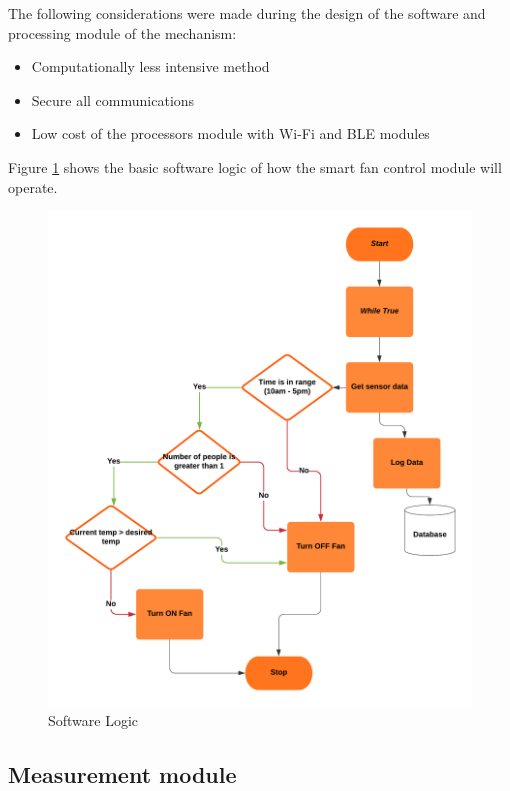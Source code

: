 The following considerations were made during the design of the software and processing module of the mechanism:

\begin{itemize}
\item Computationally less intensive method
\item Secure all communications
\item Low cost of the processors module with \ac{Wi-Fi} and BLE modules
\end{itemize}

Figure \ref{fig:softwarelogic} shows the basic software logic of how the smart fan control module will operate.

\begin{figure}[t]
\includegraphics[scale=0.15]{Figures/logic.png}
\centering
\caption{Software Logic}
\label{fig:softwarelogic}
\end{figure}

\subsection{Measurement module}

